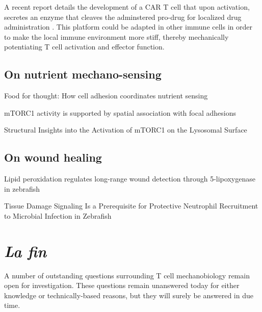 A recent report details the development of a CAR T cell that upon activation, secretes an enzyme that cleaves the adminstered pro-drug for localized drug administration \cite{Gardner2021}. This platform could be adapted in other immune cells in order to make the local immune environment more stiff, thereby mechanically potentiating T cell activation and effector function.

\subsection{On nutrient mechano-sensing}

Food for thought: How cell adhesion coordinates nutrient sensing

mTORC1 activity is supported by spatial association with focal adhesions

Structural Insights into the Activation of mTORC1 on the Lysosomal Surface

\subsection{On wound healing}

Lipid peroxidation regulates long-range wound detection through 5-lipoxygenase in zebrafish

Tissue Damage Signaling Is a Prerequisite for Protective Neutrophil Recruitment to Microbial Infection in Zebrafish

\section{\textit{La fin}}

A number of outstanding questions surrounding T cell mechanobiology remain open for investigation. These questions remain unanswered today for either knowledge or technically-based reasons, but they will surely be answered in due time.
